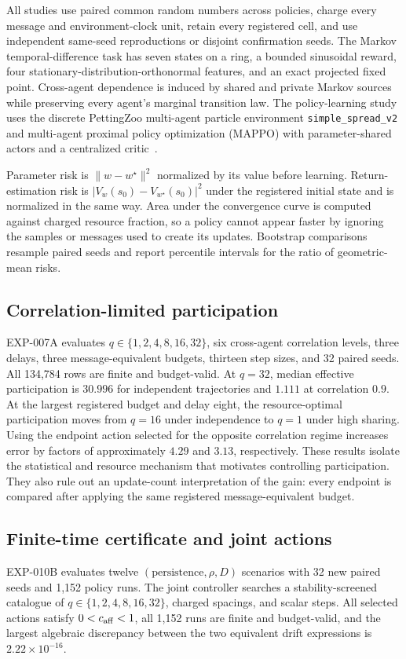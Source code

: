 \documentclass[journal]{IEEEtran}
\begin{document}
All studies use paired common random numbers across policies, charge every message and environment-clock unit, retain every registered cell, and use independent same-seed reproductions or disjoint confirmation seeds.
The Markov temporal-difference task has seven states on a ring, a bounded sinusoidal reward, four stationary-distribution-orthonormal features, and an exact projected fixed point.
Cross-agent dependence is induced by shared and private Markov sources while preserving every agent's marginal transition law.
The policy-learning study uses the discrete PettingZoo multi-agent particle environment \texttt{simple\_spread\_v2} and multi-agent proximal policy optimization (MAPPO) with parameter-shared actors and a centralized critic~\cite{terry2021pettingzoo,yu2022mappo}.

Parameter risk is $\|w-w^\star\|^2$ normalized by its value before learning.
Return-estimation risk is $|V_w(s_0)-V_{w^\star}(s_0)|^2$ under the registered initial state and is normalized in the same way.
Area under the convergence curve is computed against charged resource fraction, so a policy cannot appear faster by ignoring the samples or messages used to create its updates.
Bootstrap comparisons resample paired seeds and report percentile intervals for the ratio of geometric-mean risks.

\subsection{Correlation-limited participation}
EXP-007A evaluates $q\in\{1,2,4,8,16,32\}$, six cross-agent correlation levels, three delays, three message-equivalent budgets, thirteen step sizes, and 32 paired seeds.
All 134,784 rows are finite and budget-valid.
At $q=32$, median effective participation is $30.996$ for independent trajectories and $1.111$ at correlation $0.9$.
At the largest registered budget and delay eight, the resource-optimal participation moves from $q=16$ under independence to $q=1$ under high sharing.
Using the endpoint action selected for the opposite correlation regime increases error by factors of approximately $4.29$ and $3.13$, respectively.
These results isolate the statistical and resource mechanism that motivates controlling participation.
They also rule out an update-count interpretation of the gain: every endpoint is compared after applying the same registered message-equivalent budget.

\subsection{Finite-time certificate and joint actions}
EXP-010B evaluates twelve $(\text{persistence},\rho,D)$ scenarios with 32 new paired seeds and 1,152 policy runs.
The joint controller searches a stability-screened catalogue of $q\in\{1,2,4,8,16,32\}$, charged spacings, and scalar steps.
All selected actions satisfy $0<c_{\rm aff}<1$, all 1,152 runs are finite and budget-valid, and the largest algebraic discrepancy between the two equivalent drift expressions is $2.22\times10^{-16}$.
\end{document}
